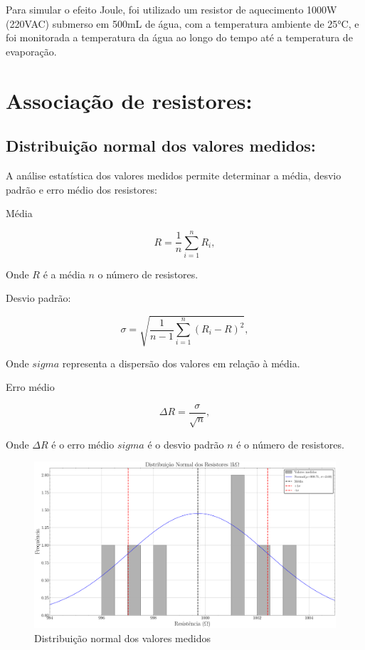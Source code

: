 \documentclass[conference]{IEEEtran}
\begin{document}
Para simular o efeito Joule, foi utilizado um resistor de aquecimento 1000W (220VAC) submerso em 500mL de água, com a temperatura ambiente de 25°C, e foi monitorada a temperatura da água ao longo do tempo até a temperatura de evaporação.


\section{Associação de resistores:}

\subsection{Distribuição normal dos valores medidos:}

A análise estatística dos valores medidos permite determinar a média, desvio padrão e erro médio dos resistores:

Média

\begin{equation}
    R = \frac{1}{n} \sum_{i=1}^{n} R_i,
\end{equation}

\noindent
Onde $R$ é a média $n$ o número de resistores.

Desvio padrão:

\begin{equation}
    \sigma = \sqrt{\frac{1}{n-1} \sum_{i=1}^{n} (R_i - R)^2},
\end{equation}

\noindent
Onde $sigma$ representa a dispersão dos valores em relação à média.

Erro médio

\begin{equation}
    \Delta R = \frac{\sigma}{\sqrt{n}}, %
\end{equation}

\noindent
Onde $\Delta R$ é o erro médio $sigma$ é o desvio padrão $n$ é o número de resistores.

\begin{figure}[htbp]
    \centering
    \caption{Distribuição normal dos valores medidos}
    \label{fig:plot_hist_1k}
    \includegraphics[width=0.8\linewidth]{figures/plot_hist_1k.pdf}
\end{figure}
\end{document}
